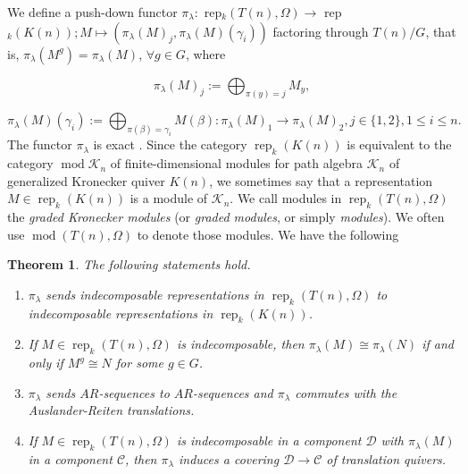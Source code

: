 \documentclass[a4paper,12pt]{amsart}
\newcommand{\cC}{\mathcal{C}}
\newcommand{\cD}{\mathcal{D}}
\newcommand{\cK}{\mathcal{K}}
\DeclareMathOperator{\rep}{rep}
\DeclareMathOperator{\modd}{mod}
\newtheorem{thm}{Theorem}[subsection]
\begin{document}
We define a push-down functor     $\pi_\lambda:$ rep$_k(T(n), \Omega)\rightarrow$ rep$_k(K(n)); M \mapsto (\pi_\lambda(M)_j, \pi_\lambda(M)(\gamma_i))$ factoring through $T(n)/G$, that is, $\pi_\lambda(M^g)=\pi_\lambda(M)$, $\forall g\in G$, where



\begin{equation*} 
\pi_\lambda(M)_j:=\bigoplus _{\pi(y)=j}M_y,
\end{equation*}
 

\begin{equation*} 
\pi_\lambda (M)(\gamma_i):=\bigoplus _{\pi(\beta)=\gamma_i} M(\beta):\pi_\lambda (M)_1\rightarrow \pi_\lambda (M)_2, j\in \{1, 2\},1\leq i\leq n.
\end{equation*}
The  functor $\pi_{\lambda}$ is  exact \cite[3.2]{Bongartz}. Since the category $\rep_k(K(n))$ is equivalent to the category  $\modd \cK_n$ of finite-dimensional modules for path algebra $\cK_n$ of generalized Kronecker quiver $K(n)$,   we sometimes say that a representation  $M\in\rep_k(K(n))$  is a module of $\mathcal{K}_n$. We call modules in $\rep_k(T(n), \Omega)$  the \textit{graded Kronecker modules} (or \textit{graded modules}, or simply \textit{modules}).  We often use  $\modd(T(n),\Omega)$ to denote  those modules.  We have the following
 
\begin{thm}\cite[Theorem 7.1]{Daniel}\label{push-down}
The following statements hold.
\begin{enumerate}


\item $\pi_\lambda$ sends indecomposable representations in $\rep_k(T(n), \Omega)$ to indecomposable representations  in $\rep_k(K(n))$.

\item If $M\in\rep_k(T(n), \Omega)$ is indecomposable, then $\pi_\lambda(M)\cong \pi_\lambda(N)$ if and only if $M^g\cong N$ for some $g\in G$.

\item $\pi_\lambda$ sends $AR$-sequences to $AR$-sequences and $\pi_\lambda$ commutes with the Auslander-Reiten translations.

\item If $M\in\rep_k(T(n), \Omega)$ is indecomposable in a component $\cD$ with $\pi_\lambda(M)$ in a component $\cC$, then $\pi_\lambda$ induces a covering $\cD\rightarrow\cC$ of translation quivers.

\end{enumerate}
\end{thm}
\end{document}
